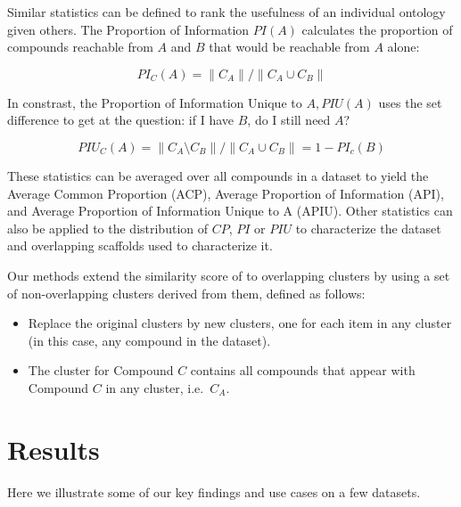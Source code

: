\documentclass[journal=jacsat,manuscript=article]{achemso}
\newcommand*\ie{i.e.~}
\begin{document}
Similar statistics can be defined to rank the usefulness of an individual ontology given others. The Proportion of Information $PI(A)$ calculates the proportion of compounds reachable from $A$ and $B$ that would be reachable from $A$ alone:

\begin{equation}
PI_C(A) = \| C_A \| / \| C_A \cup C_B \|
\end{equation}

In constrast, the Proportion of Information Unique to $A, PIU(A)$ uses the set difference to get at the question: if I have $B$, do I still need $A$? 

\begin{equation}
 PIU_C(A) = \| C_A \setminus C_B \| / \| C_A \cup C_B \| = 1 - PI_c(B)
 \end{equation}
  
These statistics can be averaged over all compounds in a dataset to yield the Average Common Proportion (ACP), Average Proportion of Information (API), and Average Proportion of Information Unique to A (APIU).  Other statistics can also be applied to the distribution of $CP$, $PI$ or $PIU$ to characterize the dataset and overlapping scaffolds used to characterize it.

Our methods extend the similarity score of \citeauthor{Torres2009} to
overlapping clusters by using a set of non-overlapping clusters
derived from them, defined as follows:
\begin{itemize}
\item Replace the original clusters by new clusters, one for each item
  in any cluster (in this case, any compound in the dataset).
\item The cluster for Compound $C$ contains all compounds that appear
  with Compound $C$ in any cluster, \ie $C_A$.
\end{itemize}


\section{Results}
\label{sec:results}
Here we illustrate some of our key findings and use cases on a few datasets. 
\end{document}

